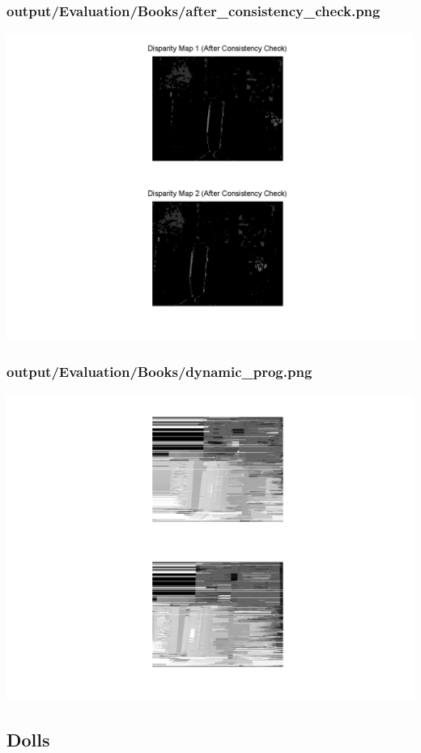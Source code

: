 \subsubsection{output/Evaluation/Books/after\_consistency\_check.png}
    \includegraphics[scale=0.5]{output/Evaluation/Books/after_consistency_check.png}

\subsubsection{output/Evaluation/Books/dynamic\_prog.png}
    \includegraphics[scale=0.5]{output/Evaluation/Books/dynamic_prog.png}

\subsection{Dolls}
